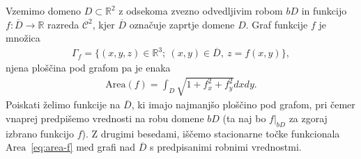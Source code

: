 \documentclass[12pt,a4paper,twoside]{article}
\theoremstyle{definition} %
\theoremstyle{plain} %
\numberwithin{equation}{section}  %
\newcommand{\R}{\mathbb R}
\begin{document}
Vzemimo domeno $D \subset \R^2$ z odsekoma zvezno odvedljivim robom $bD$ in funkcijo $f \colon \overline{D} \to \R$ razreda $\mathcal{C}^2$, kjer $\overline{D}$ označuje zaprtje domene $D$.
Graf funkcije $f$ je množica
\begin{gather}
\Gamma_{f} = \{ (x,y,z) \in \R^3; \ (x,y) \in \overline{D}, \ z=f(x,y) \},
\end{gather}
njena ploščina pod grafom pa je enaka
\begin{gather} \label{eq:area-f}
\text{Area}(f) = \int_{D} \sqrt{1 + f_{x}^2 + f_{y}^2} dxdy.
\end{gather}
Poiskati želimo funkcije na $\overline{D}$, ki imajo najmanjšo ploščino pod grafom, pri čemer vnaprej predpišemo vrednosti na robu domene $bD$ (ta naj bo $f|_{bD}$ za zgoraj izbrano funkcijo $f$). Z drugimi besedami, iščemo stacionarne točke funkcionala $\text{Area}$~\eqref{eq:area-f} med grafi nad $\overline{D}$ s predpisanimi robnimi vrednostmi.
\end{document}

